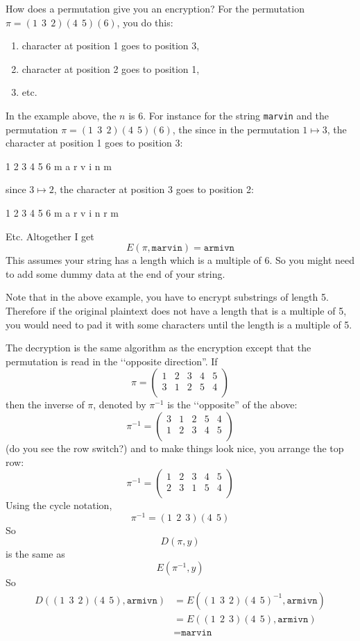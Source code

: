 How does a permutation give you an encryption?
For the permutation $\pi = (1 \ \ 3 \ \ 2)(4 \ \ 5)(6)$,
you do this:
\begin{enumerate}[nosep]
  \item
    character at position 1 goes to position 3,
  \item
    character at position 2 goes to position 1,
  \item etc.
\end{enumerate}
In the example above, the $n$ is 6.
For instance for the string \texttt{marvin}
and the permutation $\pi = (1 \ \ 3 \ \ 2)(4 \ \ 5)(6)$,
the since in the permutation $1 \mapsto 3$, the character at
position 1 goes to position 3:
\begin{smallconsole}
    1 2 3 4 5 6
    m a r v i n
        m
\end{smallconsole}
since $3 \mapsto 2$, the character at
position 3 goes to position 2:
\begin{smallconsole}
    1 2 3 4 5 6
    m a r v i n
      r m
\end{smallconsole}
Etc.
Altogether I get
\[
E(\pi, \texttt{marvin}) = \texttt{armivn}
\]
This assumes your string has a length which is a multiple of 6.
So you might need to add some dummy data at the end of your string.


Note that in the above example, you have to encrypt substrings of length 5.
Therefore if the original plaintext does not have a length that is a
multiple of 5, you would need to pad it with some characters until the
length is a multiple of 5.



The decryption is the same algorithm as the encryption
except that the permutation is read in the \lq\lq opposite direction''.
If
\[
  \pi =
  \begin{pmatrix}
    1 & 2 & 3 & 4 & 5 \\
    3 & 1 & 2 & 5 & 4 \\
  \end{pmatrix}
\]
then the inverse of $\pi$, denoted by $\pi^{-1}$ is the \lq\lq opposite''
of the above:
\[
  \pi^{-1} =
  \begin{pmatrix}
    3 & 1 & 2 & 5 & 4 \\
    1 & 2 & 3 & 4 & 5 \\
  \end{pmatrix}
\]
(do you see the row switch?) and to make things look nice, you arrange the
top row:
\[
  \pi^{-1} =
  \begin{pmatrix}
    1 & 2 & 3 & 4 & 5 \\
    2 & 3 & 1 & 5 & 4 \\
  \end{pmatrix}
\]
Using the cycle notation,
\[
  \pi^{-1} = (1 \ \ 2 \ \ 3)(4 \ \ 5)
\]
So
\[
  D(\pi, y)
\]
is the same as
\[
  E(\pi^{-1}, y)
\]
So
\begin{align*}
  D((1 \ \ 3 \ \ 2)(4 \ \ 5), \texttt{armivn})
  &= E((1 \ \ 3 \ \ 2)(4 \ \ 5)^{-1}, \texttt{armivn}) \\
  &= E((1 \ \ 2 \ \ 3)(4 \ \ 5), \texttt{armivn}) \\
  &= \texttt{marvin}
\end{align*}

